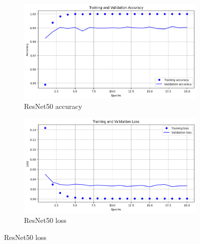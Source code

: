 \documentclass[runningheads]{llncs}
\begin{document}
\begin{figure}[htbp]
    \centering
    \begin{subfigure}[b]{0.45\textwidth}
        \includegraphics[width=\textwidth]{graphics/accuracy_resnet.png}
        \caption{ResNet50 accuracy}
        \label{fig:graph1}
    \end{subfigure}
    \hfill
    \begin{subfigure}[b]{0.45\textwidth}
        \includegraphics[width=\textwidth]{graphics/loss_resnet.png}
        \caption{ResNet50 loss}
        \label{fig:graph2}
    \end{subfigure}

    \vspace{0.5cm}


\end{figure}
\end{document}
